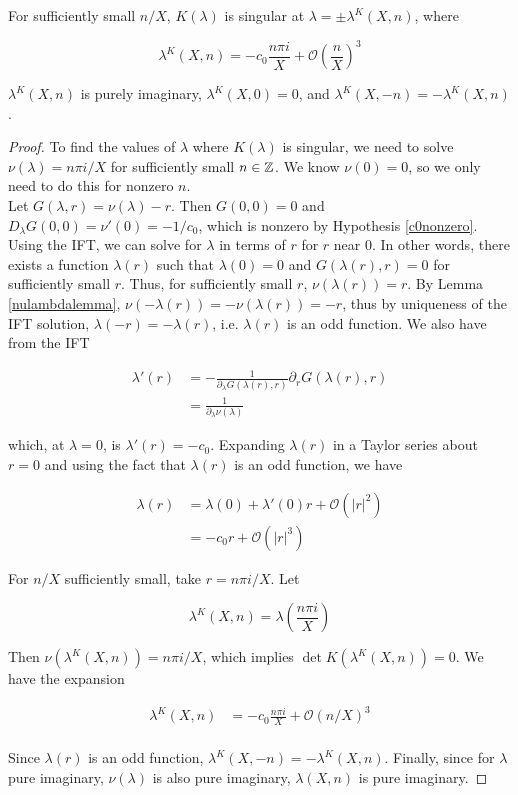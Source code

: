 \documentclass[thesis.tex]{subfiles}
\begin{document}
\begin{lemma}\label{Ksingularlemma}
For sufficiently small $n/X$, $K(\lambda)$ is singular at $\lambda = \pm \lambda^K(X,n)$, where

\begin{equation}\label{lambdaK}
\lambda^K(X,n)
= -c_0 \frac{n \pi i }{X} + \mathcal{O}\left( \frac{n}{X} \right)^3
\end{equation} 

$\lambda^K(X,n)$ is purely imaginary, $\lambda^K(X, 0) = 0$, and $\lambda^K(X, -n) = -\lambda^K(X, n)$.

\begin{proof}
To find the values of $\lambda$ where $K(\lambda)$ is singular, we need to solve $\nu(\lambda) = n \pi i/X$ for sufficiently small $n \in {\mathbb Z}$. We know $\nu(0) = 0$, so we only need to do this for nonzero $n$. \\

Let $G(\lambda, r) = \nu(\lambda) - r$. Then $G(0, 0) = 0$ and $D_\lambda G(0, 0) = \nu'(0) = -1/c_0$, which is nonzero by Hypothesis \ref{c0nonzero}. Using the IFT, we can solve for $\lambda$ in terms of $r$ for $r$ near 0. In other words, there exists a function $\lambda(r)$ such that $\lambda(0) = 0$ and $G(\lambda(r), r) = 0$ for sufficiently small $r$. Thus, for sufficiently small $r$, $\nu(\lambda(r)) = r$. By Lemma \ref{nulambdalemma}, $\nu(-\lambda(r)) = -\nu(\lambda(r)) = -r$, thus by uniqueness of the IFT solution, $\lambda(-r) = -\lambda(r)$, i.e. $\lambda(r)$ is an odd function. We also have from the IFT 

\begin{align*}
\lambda'(r) &= -\frac{1}{\partial_\lambda G(\lambda(r), r) } \partial_r G(\lambda(r), r) \\
&= \frac{1}{\partial_\lambda \nu(\lambda) } 
\end{align*}

which, at $\lambda = 0$, is $\lambda'(r) = -c_0$. Expanding $\lambda(r)$ in a Taylor series about $r = 0$ and using the fact that $\lambda(r)$ is an odd function, we have

\begin{align*}
\lambda(r) &= \lambda(0) + \lambda'(0) r + \mathcal{O}(|r|^2) \\
&= -c_0 r + \mathcal{O}(|r|^3)
\end{align*}

For $n/X$ sufficiently small, take $r = n \pi i / X$. Let 

\[
\lambda^K(X, n) = \lambda\left( \frac{n \pi i}{X} \right)
\]

Then $\nu(\lambda^K(X, n)) = n \pi i / X$, which implies $\det K(\lambda^K(X, n)) = 0$. We have the expansion

\begin{align*}
\lambda^K(X,n)
&= -c_0 \frac{n \pi i }{X} + \mathcal{O}(n/X)^3 \\
\end{align*} 

Since $\lambda(r)$ is an odd function, $\lambda^K(X,-n) = -\lambda^K(X,n)$. Finally, since for $\lambda$ pure imaginary, $\nu(\lambda)$ is also pure imaginary, $\lambda(X,n)$ is pure imaginary.
\end{proof}
\end{lemma}
\end{document}
